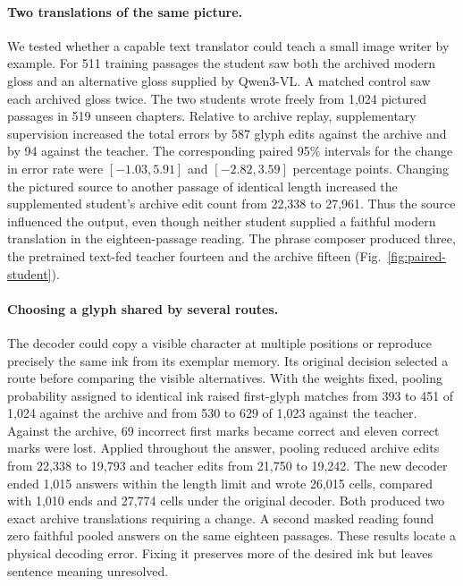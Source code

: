 \documentclass[12pt,a4paper]{article}
\providecommand{\DIFadd}[1]{{\protect\color{blue} \sf #1}} %
\begin{document}
\paragraph{\DIFadd{Two translations of the same picture.}}
\DIFadd{We tested whether a capable text translator could teach a small image writer by example. For 511 training passages the student saw both the archived modern gloss and an alternative gloss supplied by Qwen3-VL. A matched control saw each archived gloss twice. The two students wrote freely from 1,024 pictured passages in 519 unseen chapters. Relative to archive replay, supplementary supervision increased the total errors by 587 glyph edits against the archive and by 94 against the teacher. The corresponding paired 95\% intervals for the change in error rate were $[-1.03,5.91]$ and $[-2.82,3.59]$ percentage points. Changing the pictured source to another passage of identical length increased the supplemented student's archive edit count from 22,338 to 27,961. Thus the source influenced the output, even though neither student supplied a faithful modern translation in the eighteen-passage reading. The phrase composer produced three, the pretrained text-fed teacher fourteen and the archive fifteen (Fig.~\ref{fig:paired-student}).
}

\paragraph{\DIFadd{Choosing a glyph shared by several routes.}}
\DIFadd{The decoder could copy a visible character at multiple positions or reproduce precisely the same ink from its exemplar memory. Its original decision selected a route before comparing the visible alternatives. With the weights fixed, pooling probability assigned to identical ink raised first-glyph matches from 393 to 451 of 1,024 against the archive and from 530 to 629 of 1,023 against the teacher. Against the archive, 69 incorrect first marks became correct and eleven correct marks were lost. Applied throughout the answer, pooling reduced archive edits from 22,338 to 19,793 and teacher edits from 21,750 to 19,242. The new decoder ended 1,015 answers within the length limit and wrote 26,015 cells, compared with 1,010 ends and 27,774 cells under the original decoder. Both produced two exact archive translations requiring a change. A second masked reading found zero faithful pooled answers on the same eighteen passages. These results locate a physical decoding error. Fixing it preserves more of the desired ink but leaves sentence meaning unresolved.
}
\end{document}
